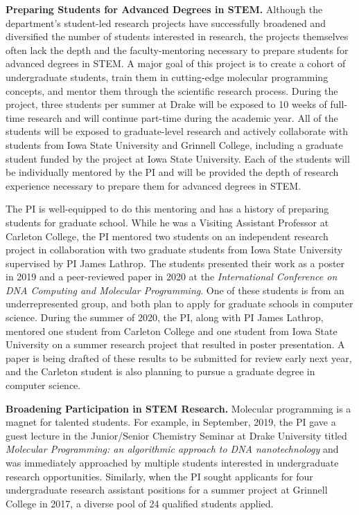\documentclass[11pt]{article}
\begin{document}
    \textbf{Preparing Students for Advanced Degrees in STEM.}
    Although the department's student-led research projects have successfully broadened and diversified the number of students interested in research, the projects themselves often lack the depth and the faculty-mentoring necessary to prepare students for advanced degrees in STEM.
    A major goal of this project is to create a cohort of undergraduate students, train them in cutting-edge molecular programming concepts, and mentor them through the scientific research process.
    During the project, three students per summer at Drake will be exposed to 10 weeks of full-time research and will continue part-time during the academic year.
    All of the students will be exposed to graduate-level research and actively collaborate with students from Iowa State University and Grinnell College, including a graduate student funded by the project at Iowa State University.
    Each of the students will be individually mentored by the PI and will be provided the depth of research experience necessary to prepare them for advanced degrees in STEM.

    The PI is well-equipped to do this mentoring and has a history of preparing students for graduate school.
    While he was a Visiting Assistant Professor at Carleton College, the PI mentored two students on an independent research project in collaboration with two graduate students from Iowa State University supervised by PI James Lathrop.
    The students presented their work as a poster in 2019 and a peer-reviewed paper in 2020 at the \emph{International Conference on DNA Computing and Molecular Programming}.
    One of these students is from an underrepresented group, and both plan to apply for graduate schools in computer science.
    During the summer of 2020, the PI, along with PI James Lathrop, mentored one student from Carleton College and one student from Iowa State University on a summer research project that resulted in poster presentation.
    A paper is being drafted of these results to be submitted for review early next year, and the Carleton student is also planning to pursue a graduate degree in computer science.

    \textbf{Broadening Participation in STEM Research.}
    Molecular programming is a magnet for talented students.
    For example, in September, 2019, the PI gave a guest lecture in the Junior/Senior Chemistry Seminar at Drake University titled \emph{Molecular Programming: an algorithmic approach to DNA nanotechnology} and was immediately approached by multiple students interested in undergraduate research opportunities.
    Similarly, when the PI sought applicants for four undergraduate research assistant positions for a summer project at Grinnell College in 2017, a diverse pool of 24 qualified students applied.
\end{document}
